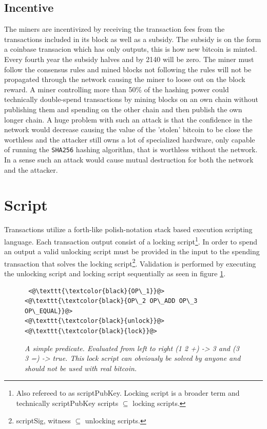 \subsection{Incentive}

The miners are incentivized by receiving the transaction fees from the transactions included in its block as well as a subsidy. The subsidy is on the form a coinbase transacion which has only outputs, this is how new bitcoin is minted. Every fourth year the subsidy halves and by 2140 will be zero. The miner must follow the consensus rules and mined blocks not following the rules will not be propagated through the network causing the miner to loose out on the block reward. A miner controlling more than 50\% of the hashing power could technically double-spend transactions by mining blocks on an own chain without publishing them and spending on the other chain and then publish the own longer chain. A huge problem with such an attack is that the confidence in the network would decrease causing the value of the 'stolen' bitcoin to be close the worthless and the attacker still owns a lot of specialized hardware, only capable of running the \texttt{SHA256} hashing algorithm, that is worthless without the network. In a sense such an attack would cause mutual destruction for both the network and the attacker. 

\section{Script}
\label{sec:script}

Transactions utilize a forth-like polish-notation stack based execution scripting language\cite{antonopoulos:mastering:bitcoin}. Each transaction output consist of a locking script\footnote{Also refereed to as scriptPubKey. Locking script is a broader term and technically scriptPubKey scripts $ \subseteq $ locking scripts.}. In order to spend an output a valid unlocking script must be provided in the input to the spending transaction that solves the locking script\footnote{scriptSig, witness $\subseteq $ unlocking scripts.}. Validation is performed by executing the unlocking script and locking script sequentially as seen in figure \ref{fig:simple:script}. 

\begin{figure}[!hbt]
		\centering
	\begin{lstlisting}
 <@\texttt{\textcolor{black}{OP\_1}}@>   <@\texttt{\textcolor{black}{OP\_2 OP\_ADD OP\_3 OP\_EQUAL}}@>
<@\texttt{\textcolor{black}{unlock}}@>           <@\texttt{\textcolor{black}{lock}}@>
	\end{lstlisting}
	
	\caption{\textit{ A simple predicate. Evaluated from left to right (1 2 +) -> 3 and
			(3 3 =) -> true. This lock script can obviously be solved by anyone and should not be used with real bitcoin.
	}}
	\label{fig:simple:script}
\end{figure}

